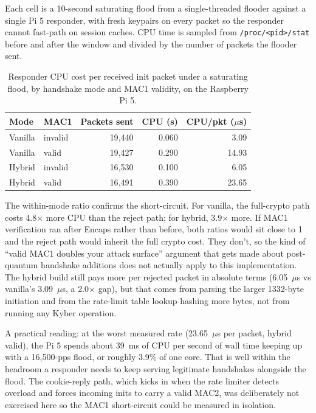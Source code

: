 \documentclass[11pt,a4paper]{article}
\begin{document}
Each cell is a 10-second saturating flood from a single-threaded flooder against a single Pi 5 responder, with fresh keypairs on every packet so the responder cannot fast-path on session caches. CPU time is sampled from \texttt{/proc/<pid>/stat} before and after the window and divided by the number of packets the flooder sent.

\begin{table}[H]
\centering
\caption{Responder CPU cost per received init packet under a saturating flood, by handshake mode and MAC1 validity, on the Raspberry Pi 5.}
\label{tab:dos_flood}
\begin{tabular}{@{}llrrr@{}}
\toprule
\textbf{Mode} & \textbf{MAC1} & \textbf{Packets sent} & \textbf{CPU (s)} & \textbf{CPU/pkt ($\mu$s)} \\
\midrule
Vanilla & invalid  & 19{,}440 & 0.060 &  3.09 \\
Vanilla & valid    & 19{,}427 & 0.290 & 14.93 \\
\midrule
Hybrid  & invalid  & 16{,}530 & 0.100 &  6.05 \\
Hybrid  & valid    & 16{,}491 & 0.390 & 23.65 \\
\bottomrule
\end{tabular}
\end{table}

The within-mode ratio confirms the short-circuit. For vanilla, the full-crypto path costs 4.8$\times$ more CPU than the reject path; for hybrid, 3.9$\times$ more. If MAC1 verification ran after Encaps rather than before, both ratios would sit close to 1 and the reject path would inherit the full crypto cost. They don't, so the kind of ``valid MAC1 doubles your attack surface'' argument that gets made about post-quantum handshake additions does not actually apply to this implementation. The hybrid build still pays more per rejected packet in absolute terms (6.05~$\mu$s vs vanilla's 3.09~$\mu$s, a 2.0$\times$ gap), but that comes from parsing the larger 1332-byte initiation and from the rate-limit table lookup hashing more bytes, not from running any Kyber operation.

A practical reading: at the worst measured rate (23.65~$\mu$s per packet, hybrid valid), the Pi 5 spends about 39~ms of CPU per second of wall time keeping up with a 16{,}500-pps flood, or roughly 3.9\% of one core. That is well within the headroom a responder needs to keep serving legitimate handshakes alongside the flood. The cookie-reply path, which kicks in when the rate limiter detects overload and forces incoming inits to carry a valid MAC2, was deliberately not exercised here so the MAC1 short-circuit could be measured in isolation.
\end{document}
